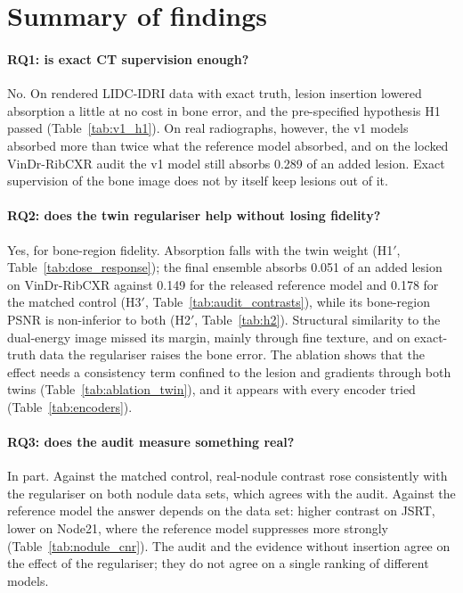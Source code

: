 \section{Summary of findings}
\paragraph{RQ1: is exact CT supervision enough?} No. On rendered LIDC-IDRI data with exact truth, lesion insertion lowered absorption a little
at no cost in bone error, and the pre-specified hypothesis H1 passed (Table~\ref{tab:v1_h1}). On real radiographs, however, the v1 models
absorbed more than twice what the reference model absorbed, and on the locked VinDr-RibCXR audit the v1 model still absorbs 0.289 of an added
lesion. Exact supervision of the bone image does not by itself keep lesions out of it.

\paragraph{RQ2: does the twin regulariser help without losing fidelity?} Yes, for bone-region fidelity. Absorption falls with the twin weight
(H1$'$, Table~\ref{tab:dose_response}); the final ensemble absorbs 0.051 of an added lesion on VinDr-RibCXR against 0.149 for the released
reference model and 0.178 for the matched control (H3$'$, Table~\ref{tab:audit_contrasts}), while its bone-region PSNR is non-inferior to both
(H2$'$, Table~\ref{tab:h2}). Structural similarity to the dual-energy image missed its margin, mainly through fine texture, and on exact-truth
data the regulariser raises the bone error. The ablation shows that the effect needs a consistency term confined to the lesion and gradients
through both twins (Table~\ref{tab:ablation_twin}), and it appears with every encoder tried (Table~\ref{tab:encoders}).

\paragraph{RQ3: does the audit measure something real?} In part. Against the matched control, real-nodule contrast rose consistently with the
regulariser on both nodule data sets, which agrees with the audit. Against the reference model the answer depends on the data set: higher
contrast on JSRT, lower on Node21, where the reference model suppresses more strongly (Table~\ref{tab:nodule_cnr}). The audit and the evidence
without insertion agree on the effect of the regulariser; they do not agree on a single ranking of different models.

